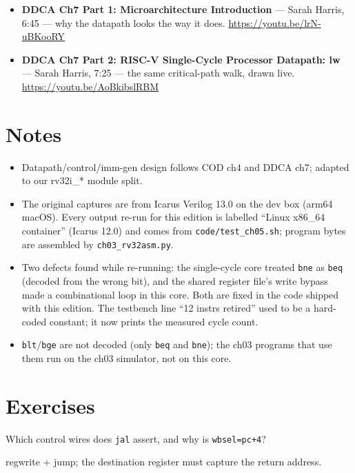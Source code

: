 \begin{rulebox}
\begin{itemize}
\item \textbf{DDCA Ch7 Part 1: Microarchitecture Introduction} ---
      Sarah Harris, 6:45 --- why the datapath looks the way it does.
      \url{https://youtu.be/lrN-uBKooRY}
\item \textbf{DDCA Ch7 Part 2: RISC-V Single-Cycle Processor
      Datapath: lw} --- Sarah Harris, 7:25 --- the same critical-path
      walk, drawn live. \url{https://youtu.be/AoBkibslRBM}
\end{itemize}
\end{rulebox}

\section*{Notes}
\label{sec:notes05}
\begin{itemize}
\item Datapath/control/imm-gen design follows COD ch4 and DDCA ch7;
      adapted to our rv32i\_* module split.
\item The original captures are from Icarus Verilog 13.0 on the
      dev box (arm64 macOS). Every output re-run for this edition is
      labelled ``Linux x86\_64 container'' (Icarus 12.0) and comes from
      \texttt{code/test\_ch05.sh}; program bytes are assembled by
      \texttt{ch03\_rv32asm.py}.
\item Two defects found while re-running: the single-cycle core
      treated \texttt{bne} as \texttt{beq} (decoded from the wrong
      bit), and the shared register file's write bypass made a
      combinational loop in this core. Both are fixed in the code
      shipped with this edition. The testbench line ``12 instrs retired''
      used to be a hard-coded constant; it now prints the measured
      cycle count.
\item \texttt{blt}/\texttt{bge} are not decoded (only \texttt{beq} and
      \texttt{bne}); the ch03 programs that use them run on the ch03
      simulator, not on this core.
\end{itemize}

\section{Exercises}
\label{sec:exercises05}

\begin{exercise}[easy]\label{ex:e05a}
Which control wires does \texttt{jal} assert, and why is
\texttt{wbsel=pc+4}?
\end{exercise}
\begin{solution}[hint]
regwrite + jump; the destination register must capture the return
address.
\end{solution}

